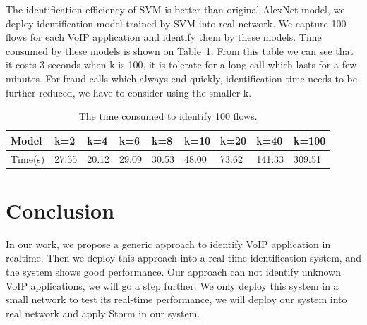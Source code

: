 \documentclass[conference]{IEEEtran}
\begin{document}
The identification efficiency of SVM is better than original AlexNet model, we deploy identification model trained by SVM into real network. We capture 100 flows for each VoIP application and identify them by these models. Time consumed by these models is shown on Table~\ref{tab:time4folws}. From this table we can see that it costs 3 seconds when k is 100, it is tolerate for a long call which lasts for a few minutes. For fraud calls which always end quickly, identification time needs to be further reduced, we have to consider using the smaller k.
\begin{table}
  \caption{The time consumed to identify 100 flows.}
  \label{tab:time4folws}
  \centering
  \begin{tabular}{p{1cm}p{0.6cm}p{0.6cm}p{0.6cm}p{0.6cm}p{0.6cm}p{0.6cm}p{0.6cm}p{0.6cm}}
    \hline
    Model & k=2 &k=4 &k=6&k=8&k=10&k=20&k=40&k=100\\
    \hline
    Time(s)      & 27.55  & 20.12  &29.09&30.53&48.00&73.62&141.33&309.51  \\
    \hline
  \end{tabular}
\end{table}

\section{Conclusion}
\label{sec:conclusion}
In our work, we propose a generic approach to identify VoIP application in realtime. Then we deploy this approach into a real-time identification system, and the system shows good performance. Our approach can not identify unknown VoIP applications, we will go a step further. We only deploy this system in a small network to test its real-time performance, we will deploy our system into real network and apply Storm in our system.




\end{document}
